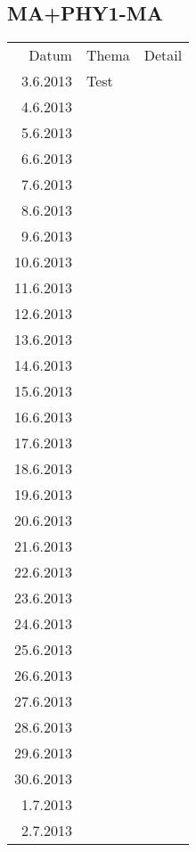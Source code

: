\subsection{MA+PHY1-MA}
\begin{tabular}{r l p{}}
\rowcolor{lgray} Datum     & Thema         & Detail \\
\rowcolor{white}  3.6.2013 & Test          &  \\
\rowcolor{lgray}  4.6.2013 &               &  \\
\rowcolor{white}  5.6.2013 &               &  \\
\rowcolor{lgray}  6.6.2013 &               &  \\
\rowcolor{white}  7.6.2013 &               &  \\
\rowcolor{lgray}  8.6.2013 &               &  \\
\rowcolor{white}  9.6.2013 &               &  \\
\rowcolor{lgray} 10.6.2013 &               &  \\
\rowcolor{white} 11.6.2013 &               &  \\
\rowcolor{lgray} 12.6.2013 &               &  \\
\rowcolor{white} 13.6.2013 &               &  \\
\rowcolor{lgray} 14.6.2013 &               &  \\
\rowcolor{white} 15.6.2013 &               &  \\
\rowcolor{lgray} 16.6.2013 &               &  \\
\rowcolor{white} 17.6.2013 &               &  \\
\rowcolor{lgray} 18.6.2013 &               &  \\
\rowcolor{white} 19.6.2013 &               &  \\
\rowcolor{lgray} 20.6.2013 &               &  \\
\rowcolor{white} 21.6.2013 &               &  \\
\rowcolor{lgray} 22.6.2013 &               &  \\
\rowcolor{white} 23.6.2013 &               &  \\
\rowcolor{lgray} 24.6.2013 &               &  \\
\rowcolor{white} 25.6.2013 &               &  \\
\rowcolor{lgray} 26.6.2013 &               &  \\
\rowcolor{white} 27.6.2013 &               &  \\
\rowcolor{lgray} 28.6.2013 &               &  \\
\rowcolor{white} 29.6.2013 &               &  \\
\rowcolor{lgray} 30.6.2013 &               &  \\
\rowcolor{white}  1.7.2013 &               &  \\
\rowcolor{lgray}  2.7.2013 &               &  \\
\end{tabular}

